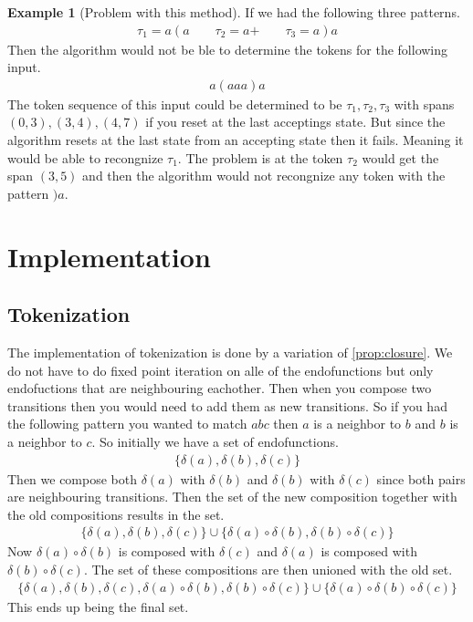 \documentclass[a4paper,12pt]{article}
\theoremstyle{definition}
\newtheorem{example}{Example}[section]
\begin{document}
\begin{example}[Problem with this method]
  If we had the following three patterns.
  \begin{align*}
    \tau_1 = a(a \qquad \tau_2 = a\text{+} \qquad \tau_3 = a)a
  \end{align*}
  Then the algorithm would not be ble to determine the tokens for the following input.
  \begin{align*}
    a(aaa)a
  \end{align*}
  The token sequence of this input could be determined to be $\tau_1, \tau_2, \tau_3$ with spans $(0, 3), (3, 4), (4, 7)$ if you reset at the last acceptings state. But since the algorithm resets at the last state from an accepting state then it fails. Meaning it would be able to recongnize $\tau_1$. The problem is at the token $\tau_2$ would get the span $(3, 5)$ and then the algorithm would not recongnize any token with the pattern $)a$.
\end{example}
\section{Implementation}
\subsection{Tokenization}
The implementation of tokenization is done by a variation of \ref{prop:closure}. We do not have to do fixed point iteration on alle of the endofunctions but only endofuctions that are neighbouring eachother. Then when you compose two transitions then you would need to add them as new transitions. So if you had the following pattern you wanted to match $abc$ then $a$ is a neighbor to $b$ and $b$ is a neighbor to $c$. So initially we have a set of endofunctions.
\begin{align*}
  \{\delta(a), \delta(b), \delta(c)\}
\end{align*}
Then we compose both $\delta(a)$ with $\delta(b)$ and $\delta(b)$ with $\delta(c)$ since both pairs are neighbouring transitions. Then the set of the new composition together with the old compositions results in the set.
\begin{align*}
  \{\delta(a), \delta(b), \delta(c)\} \cup \{\delta(a) \circ \delta(b), \delta(b) \circ \delta(c)\}
\end{align*}
Now $\delta(a) \circ \delta(b)$ is composed with $\delta(c)$ and $\delta(a)$ is composed with $\delta(b) \circ \delta(c)$. The set of these compositions are then unioned with the old set.
\begin{align*}
  \{\delta(a), \delta(b), \delta(c), \delta(a) \circ \delta(b), \delta(b) \circ \delta(c)\} \cup \{\delta(a) \circ \delta(b) \circ \delta(c)\}
\end{align*}
This ends up being the final set.
\end{document}

